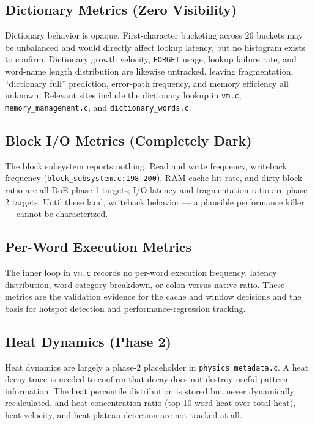 \subsection{Dictionary Metrics (Zero Visibility)}

Dictionary behavior is opaque. First-character bucketing across 26 buckets may
be unbalanced and would directly affect lookup latency, but no histogram exists
to confirm. Dictionary growth velocity, \texttt{FORGET} usage, lookup failure
rate, and word-name length distribution are likewise untracked, leaving
fragmentation, ``dictionary full'' prediction, error-path frequency, and memory
efficiency all unknown. Relevant sites include the dictionary lookup in
\texttt{vm.c}, \texttt{memory\_management.c}, and \texttt{dictionary\_words.c}.

\subsection{Block I/O Metrics (Completely Dark)}

The block subsystem reports nothing. Read and write frequency, writeback
frequency (\texttt{block\_subsystem.c:198--200}), RAM cache hit rate, and dirty
block ratio are all DoE phase-1 targets; I/O latency and fragmentation ratio are
phase-2 targets. Until these land, writeback behavior --- a plausible
performance killer --- cannot be characterized.

\subsection{Per-Word Execution Metrics}

The inner loop in \texttt{vm.c} records no per-word execution frequency, latency
distribution, word-category breakdown, or colon-versus-native ratio. These
metrics are the validation evidence for the cache and window decisions and the
basis for hotspot detection and performance-regression tracking.

\subsection{Heat Dynamics (Phase 2)}

Heat dynamics are largely a phase-2 placeholder in
\texttt{physics\_metadata.c}. A heat decay trace is needed to confirm that decay
does not destroy useful pattern information. The heat percentile distribution is
stored but never dynamically recalculated, and heat concentration ratio
(top-10-word heat over total heat), heat velocity, and heat plateau detection
are not tracked at all.

